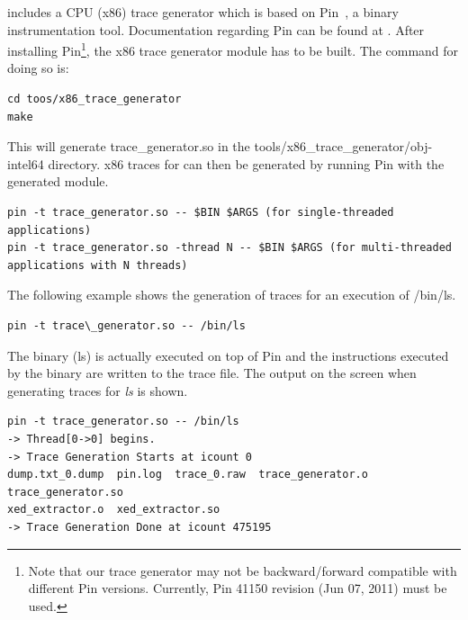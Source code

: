 \SIM includes a CPU (x86) trace generator which is based on Pin~\cite{pin}, a
binary instrumentation tool. Documentation regarding Pin can be found at
. After installing Pin\footnote{Note that our
trace generator may not be backward/forward compatible with different Pin
versions. Currently, Pin 41150 revision (Jun 07, 2011) must be used.}, the x86
trace generator module has to be built. The command for doing so is:





\begin{Verbatim}
cd toos/x86_trace_generator
make
\end{Verbatim}

\noindent
This will generate trace\_generator.so in the
tools/x86\_trace\_generator/obj-intel64 directory. x86
traces for \SIM can then be generated by running Pin with the generated module.


\begin{Verbatim}
pin -t trace_generator.so -- $BIN $ARGS (for single-threaded applications)
pin -t trace_generator.so -thread N -- $BIN $ARGS (for multi-threaded applications with N threads)
\end{Verbatim}


The following example shows the generation of traces for an execution of /bin/ls. 

\begin{Verbatim}
pin -t trace\_generator.so -- /bin/ls
\end{Verbatim}

\noindent The binary (ls) is actually executed on top of Pin and the
instructions executed by the binary are written to the trace file. The output
on the screen when generating traces for \textit{ls} is shown.



\begin{Verbatim}
pin -t trace_generator.so -- /bin/ls
-> Thread[0->0] begins.
-> Trace Generation Starts at icount 0
dump.txt_0.dump  pin.log  trace_0.raw  trace_generator.o  trace_generator.so  
xed_extractor.o  xed_extractor.so
-> Trace Generation Done at icount 475195
\end{Verbatim}

